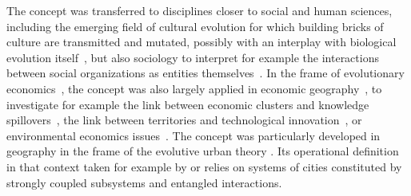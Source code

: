 \documentclass[11pt]{article}
\begin{document}
The concept was transferred to disciplines closer to social and human sciences, including the emerging field of cultural evolution \cite{Mesoudi25072017} for which building bricks of culture are transmitted and mutated, possibly with an interplay with biological evolution itself~\citep{bull2000meme}, but also sociology to interpret for example the interactions between social organizations as entities themselves~\citep{volberda2003co}. In the frame of evolutionary economics~\citep{nelson2009evolutionary}, the concept was also largely applied in economic geography~\citep{schamp201020}, to investigate for example the link between economic clusters and knowledge spillovers~\citep{doi:10.1080/00343400802662658}, the link between territories and technological innovation~\citep{colletis2010co}, or environmental economics issues~\citep{kallis2007coevolution}. The concept was particularly developed in geography in the frame of the evolutive urban theory \citep{pumain1997pour}. Its operational definition in that context taken for example by \cite{paulus2004coevolution} or \cite{schmitt2014modelisation} relies on systems of cities constituted by strongly coupled subsystems and entangled interactions.



\end{document}
